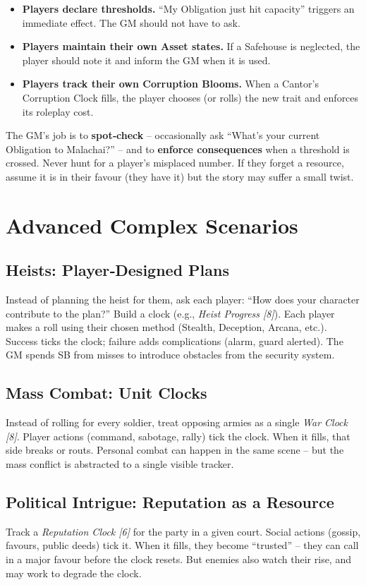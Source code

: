 \begin{itemize}
  \item \textbf{Players declare thresholds.} “My Obligation just hit capacity” triggers an immediate effect. The GM should not have to ask.
  \item \textbf{Players maintain their own Asset states.} If a Safehouse is neglected, the player should note it and inform the GM when it is used.
  \item \textbf{Players track their own Corruption Blooms.} When a Cantor’s Corruption Clock fills, the player chooses (or rolls) the new trait and enforces its roleplay cost.
\end{itemize}

The GM’s job is to \textbf{spot‑check} – occasionally ask “What’s your current Obligation to Malachai?” – and to \textbf{enforce consequences} when a threshold is crossed. Never hunt for a player’s misplaced number. If they forget a resource, assume it is in their favour (they have it) but the story may suffer a small twist.

\section{Advanced Complex Scenarios}

\subsection*{Heists: Player‑Designed Plans}
Instead of planning the heist for them, ask each player: “How does your character contribute to the plan?” Build a clock (e.g., \emph{Heist Progress [8]}). Each player makes a roll using their chosen method (Stealth, Deception, Arcana, etc.). Success ticks the clock; failure adds complications (alarm, guard alerted). The GM spends SB from misses to introduce obstacles from the security system.

\subsection*{Mass Combat: Unit Clocks}
Instead of rolling for every soldier, treat opposing armies as a single \emph{War Clock [8]}. Player actions (command, sabotage, rally) tick the clock. When it fills, that side breaks or routs. Personal combat can happen in the same scene – but the mass conflict is abstracted to a single visible tracker.

\subsection*{Political Intrigue: Reputation as a Resource}
Track a \emph{Reputation Clock [6]} for the party in a given court. Social actions (gossip, favours, public deeds) tick it. When it fills, they become “trusted” – they can call in a major favour before the clock resets. But enemies also watch their rise, and may work to degrade the clock.

